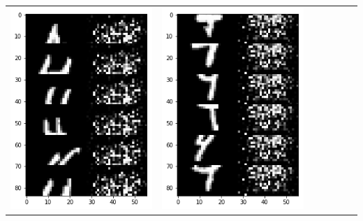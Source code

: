 \documentclass[12pt]{report} %
\begin{document}
\begin{tabular}{m{0.7cm}m{2.4cm}m{2.4cm}m{2.4cm}m{2.4cm}m{2.4cm}m{2.4cm}}
\includegraphics[scale=0.3]{pictures/M2_4_up.png} & \includegraphics[scale=0.3]{pictures/M2_4_down.png}\\
\end{tabular}
\end{document}
